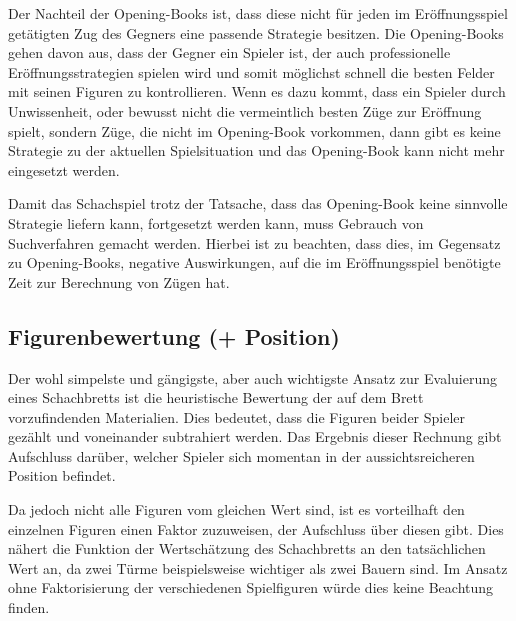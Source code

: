 Der Nachteil der Opening-Books ist, dass diese nicht für jeden im Eröffnungsspiel getätigten Zug des Gegners eine passende Strategie besitzen. Die Opening-Books gehen davon aus, dass der Gegner ein Spieler ist, der auch professionelle Eröffnungsstrategien spielen wird und somit möglichst schnell die besten Felder mit seinen Figuren zu kontrollieren. Wenn es dazu kommt, dass ein Spieler durch Unwissenheit, oder bewusst nicht die vermeintlich besten Züge zur Eröffnung spielt, sondern Züge, die nicht im Opening-Book vorkommen, dann gibt es keine Strategie zu der aktuellen Spielsituation und das Opening-Book kann nicht mehr eingesetzt werden. 

Damit das Schachspiel trotz der Tatsache, dass das Opening-Book keine sinnvolle Strategie liefern kann, fortgesetzt werden kann, muss Gebrauch von Suchverfahren gemacht werden. Hierbei ist zu beachten, dass dies, im Gegensatz zu Opening-Books, negative Auswirkungen, auf die im Eröffnungsspiel benötigte Zeit zur Berechnung von Zügen hat.




\subsection{Figurenbewertung (+ Position)}\label{material_evaluation}

Der wohl simpelste und gängigste, aber auch wichtigste Ansatz zur Evaluierung eines Schachbretts ist die heuristische Bewertung der auf dem Brett vorzufindenden Materialien. Dies bedeutet, dass die Figuren beider Spieler gezählt und voneinander subtrahiert werden. Das Ergebnis dieser Rechnung gibt Aufschluss darüber, welcher Spieler sich momentan in der aussichtsreicheren Position befindet.

Da jedoch nicht alle Figuren vom gleichen Wert sind, ist es vorteilhaft den einzelnen Figuren einen Faktor zuzuweisen, der Aufschluss über diesen gibt. Dies nähert die Funktion der Wertschätzung des Schachbretts an den tatsächlichen Wert an, da zwei Türme beispielsweise wichtiger als zwei Bauern sind. Im Ansatz ohne Faktorisierung der verschiedenen Spielfiguren würde dies keine Beachtung finden.

